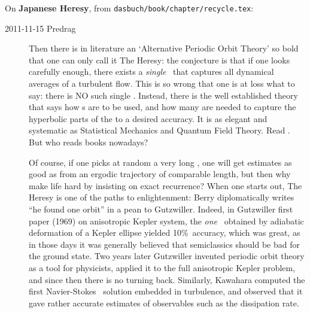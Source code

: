 On {\bf Japanese Heresy},
from \texttt{dasbuch/book/chapter/recycle.tex}:
\begin{description}
\item[2011-11-15  Predrag]%
Then there is in literature an `Alternative Periodic Orbit Theory' so
bold that one can only call it The Heresy: the conjecture is that if
one looks carefully enough, there exists a \emph{single} \po\ that
captures all dynamical averages of a turbulent flow. This is so wrong
that one is at loss what to say: there is NO such single \po.
Instead, there is the well established theory that says how \po s are
to be used, and how many are needed to capture the hyperbolic parts
of the {\nws} to a desired accuracy. It is as elegant and systematic
as Statistical Mechanics and Quantum Field Theory. Read
. But who reads books
nowadays?

Of course, if one picks at random a very long \po, one will get
estimates as good as from an ergodic trajectory of comparable length,
but then why make life hard by insisting on exact recurrence? When one
starts out, The Heresy is one of the paths to enlightenment: Berry
diplomatically writes ``he found one orbit'' in a pean to
Gutzwiller. Indeed, in Gutzwiller first paper
(1969) on anisotropic Kepler system,  the \emph{one} \po\ obtained by
adiabatic deformation of a Kepler ellipse yielded 10\%\ accuracy,
which was great, as in those days it was generally believed that
semiclassics should be bad for the ground state. Two years later
Gutzwiller invented periodic orbit theory as a tool for physicists,
applied it to the full anisotropic Kepler problem, and since then
there is no turning back. Similarly, Kawahara
computed the first Navier-Stokes \po\ solution embedded in turbulence,
and observed that it gave rather accurate estimates of observables
such as the dissipation rate.
\end{description}



